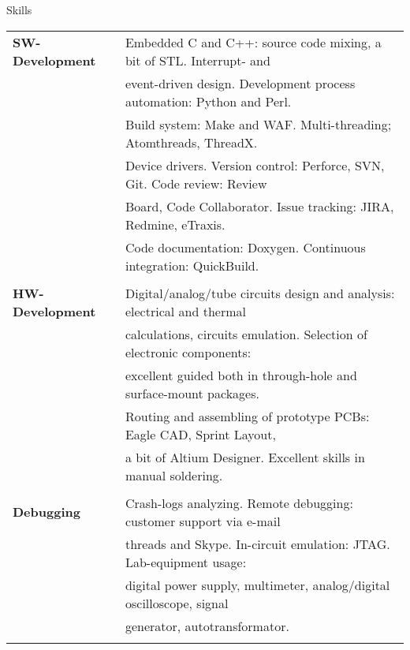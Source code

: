 \documentclass{template}
\begin{document}

\begin{rSection}{Skills}

\begin{tabular}{ @{} >{\bfseries}l @{\hspace{6ex}} l }
SW-Development  & Embedded C and C++: source code mixing, a bit of STL. Interrupt- and \\
                & event-driven design. Development process automation: Python and Perl. \\
                & Build system: Make and WAF. Multi-threading; Atomthreads, ThreadX. \\
                & Device drivers. Version control: Perforce, SVN, Git. Code review: Review \\
                & Board, Code Collaborator. Issue tracking: JIRA, Redmine, eTraxis. \\
                & Code documentation: Doxygen. Continuous integration: QuickBuild.\\ \\

HW-Development  & Digital/analog/tube circuits design and analysis: electrical and thermal \\
                & calculations, circuits emulation. Selection of electronic components: \\
                & excellent guided both in through-hole and surface-mount packages. \\
                & Routing and assembling of prototype PCBs: Eagle CAD, Sprint Layout, \\
                & a bit of Altium Designer. Excellent skills in manual soldering. \\ \\

Debugging       & Crash-logs analyzing. Remote debugging: customer support via e-mail \\
                & threads and Skype. In-circuit emulation: JTAG. Lab-equipment usage: \\ 
                & digital power supply, multimeter, analog/digital oscilloscope, signal \\
                & generator, autotransformator. \\ \\


\end{tabular}
\end{rSection}
\end{document}
